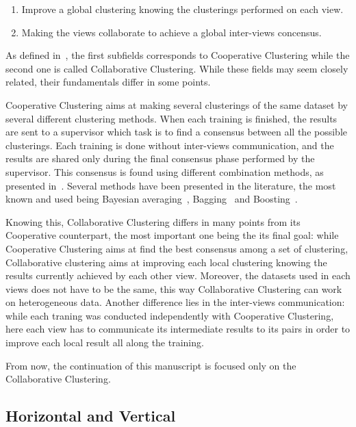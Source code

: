     \begin{enumerate}
        \item Improve a global clustering knowing the clusterings performed on each view.
        \item Making the views collaborate to achieve a global inter-views concensus.
    \end{enumerate}

    As defined in~\cite{cornuejols2018collaborative}, the first subfields corresponds to Cooperative Clustering while the second one is called Collaborative Clustering. While these fields may seem closely related, their fundamentals differ in some points.

    Cooperative Clustering aims at making several clusterings of the same dataset by several different clustering methods. When each training is finished, the results are sent to a supervisor which task is to find a consensus between all the possible clusterings. Each training is done without inter-views communication, and the results are shared only during the final consensus phase performed by the supervisor. This consensus is found using different combination methods, as presented in~\cite{kittler1998combining,dietterich2000ensemble}. Several methods have been presented in the literature, the most known and used being Bayesian averaging~\cite{kittler1998combining}, Bagging~\cite{breiman1996bagging} and Boosting~\cite{freund1997decision}.

    Knowing this, Collaborative Clustering differs in many points from its Cooperative counterpart, the most important one being the its final goal: while Cooperative Clustering aims at find the best consensus among a set of clustering, Collaborative clustering aims at improving each local clustering knowing the results currently achieved by each other view. Moreover, the datasets used in each views does not have to be the same, this way Collaborative Clustering can work on heterogeneous data. Another difference lies in the inter-views communication: while each traning was conducted independently with Cooperative Clustering, here each view has to communicate its intermediate results to its pairs in order to improve each local result all along the training.
    
    From now, the continuation of this manuscript is focused only on the Collaborative Clustering.

    \subsection{Horizontal and Vertical}
\label{sec:cc_hor_ver}

